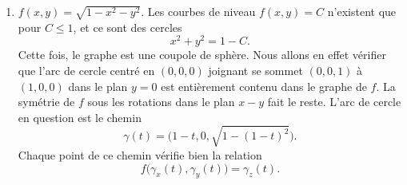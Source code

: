 \begin{example}
\begin{enumerate}
		      Il ne suffit donc pas de calculer les limites de \ref{EqDerrPaert0041x} et de \ref{EqDerrPart0041y} pour trouver la différentielle de $f$ en $(0,0)$. Il n'est par contre pas très compliqué de remarquer que les dérivées partielles n'existent pas en $(0,0)$, par exemple parce que
		      \begin{equation}
			      \lim_{t\to 0}\frac{ f(t,0)-f(0,0) }{ t }
		      \end{equation}
		      n'existe pas pour cause de limite différente pour $t>0$ et $t<0$. Il n'y a donc pas de plan tangent.  Ceci est conforme à l'intuition : il n'y a pas de plan tangent à un cône en son sommet.

		      Nous pouvons faire une petite vérification du fait que le graphe est bien un cône : la droite reliant $(0,0,0)$ à $(x,y,\sqrt{x^2+y^2})$ est entièrement contenue dans le graphe de $f$. En effet si nous posons
		      \begin{equation}
			      \gamma(t)=(tx,ty,t\sqrt{x^2+y^2}),
		      \end{equation}
		      pour tout $t$, nous avons $\gamma_z(t)=f\big( \gamma_x(t)^2+\gamma_y(t)^2 \big)$.



		\item
		      $f(x,y)=\sqrt{1-x^2-y^2}$. Les courbes de niveau $f(x,y)=C$ n'existent que pour $C\leq 1$, et ce sont des cercles
		      \begin{equation}
			      x^2+y^2=1-C.
		      \end{equation}
		      Cette fois, le graphe est une coupole de sphère. Nous allons en effet vérifier que l'arc de cercle centré en $(0,0,0)$ joignant se sommet $(0,0,1)$ à $(1,0,0)$ dans le plan $y=0$ est entièrement contenu dans le graphe de $f$. La symétrie de $f$ sous les rotations dans le plan $x-y$ fait le reste. L'arc de cercle en question est le chemin
		      \begin{equation}
			      \gamma(t)=\big( 1-t,0,\sqrt{1-(1-t)^2} \big).
		      \end{equation}
		      Chaque point de ce chemin vérifie bien la relation
		      \begin{equation}
			      f\big( \gamma_x(t),\gamma_y(t) \big)=\gamma_z(t).
		      \end{equation}


\end{enumerate}
\end{example}
